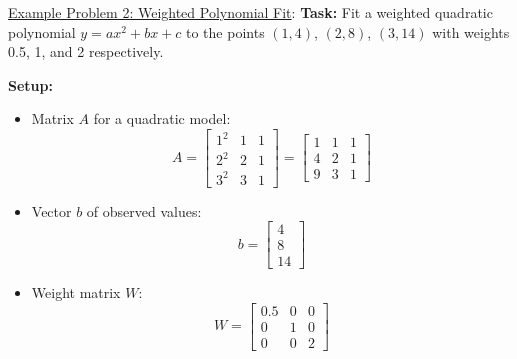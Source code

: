 \documentclass[8pt, a4paper, landscape]{extarticle} %
\begin{document}
\begin{multicols*}{4}
  \underline{Example Problem 2: Weighted Polynomial Fit}:
  \textbf{Task:} Fit a weighted quadratic polynomial \( y = ax^2 + bx + c \) to the points \((1, 4)\), \((2, 8)\), \((3, 14)\) with weights 0.5, 1, and 2 respectively.

  \textbf{Setup:}
  \begin{itemize}
    \item Matrix \( A \) for a quadratic model:
          \[ A = \begin{bmatrix} 1^2 & 1 & 1 \\ 2^2 & 2 & 1 \\ 3^2 & 3 & 1 \end{bmatrix} = \begin{bmatrix} 1 & 1 & 1 \\ 4 & 2 & 1 \\ 9 & 3 & 1 \end{bmatrix} \]
    \item Vector \( b \) of observed values:
          \[ b = \begin{bmatrix} 4 \\ 8 \\ 14 \end{bmatrix} \]
    \item Weight matrix \( W \):
          \[ W = \begin{bmatrix} 0.5 & 0 & 0 \\ 0 & 1 & 0 \\ 0 & 0 & 2 \end{bmatrix} \]
  \end{itemize}


\end{multicols*}
\end{document}
